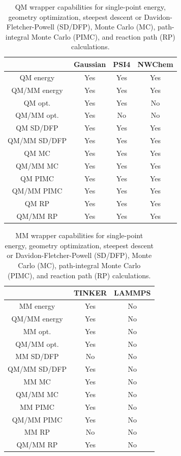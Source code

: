 \documentclass[12pt]{report}
\begin{document}
\begin{table}[hbt]
 \centering
 \begin{tabular}{|c|c c c|}
 \hline
  & Gaussian & PSI4 & NWChem \\ \hline
 QM energy & Yes & Yes & Yes \\
 QM/MM energy & Yes & Yes & Yes \\ \hline
 QM opt. & Yes & Yes & No \\
 QM/MM opt. & Yes & No & No \\ \hline
 QM SD/DFP & Yes & Yes & Yes \\
 QM/MM SD/DFP & Yes & Yes & Yes \\ \hline
 QM MC & Yes & Yes & Yes \\
 QM/MM MC & Yes & Yes & Yes \\ \hline
 QM PIMC & Yes & Yes & Yes \\
 QM/MM PIMC & Yes & Yes & Yes \\ \hline
 QM RP & Yes & Yes & Yes \\
 QM/MM RP & Yes & Yes & Yes \\ \hline
 \end{tabular}
 \caption{
 QM wrapper capabilities for single-point energy, geometry optimization,
 steepest descent or Davidon-Fletcher-Powell (SD/DFP), Monte Carlo (MC),
 path-integral Monte Carlo (PIMC), and reaction path (RP) calculations.}
 \label{tab:QMWrapCap}
\end{table}

\begin{table}[hbt]
 \centering
 \begin{tabular}{|c|c c|}
 \hline
  & TINKER & LAMMPS \\ \hline
 MM energy &  Yes & No \\
 QM/MM energy & Yes & No \\ \hline
 MM opt. & Yes & No \\
 QM/MM opt. & Yes & No \\ \hline
 MM SD/DFP & No & No \\
 QM/MM SD/DFP & Yes & No \\ \hline
 MM MC & Yes & No \\
 QM/MM MC & Yes & No \\ \hline
 MM PIMC & Yes & No \\
 QM/MM PIMC & Yes & No \\ \hline
 MM RP & No & No \\
 QM/MM RP & Yes & No \\ \hline
 \end{tabular}
 \caption{
 MM wrapper capabilities for single-point energy, geometry optimization,
 steepest descent or Davidon-Fletcher-Powell (SD/DFP), Monte Carlo (MC),
 path-integral Monte Carlo (PIMC), and reaction path (RP) calculations.}
 \label{tab:MMWrapCap}
\end{table}
\end{document}
